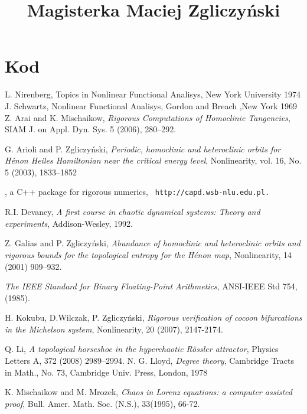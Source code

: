 \documentclass[10pt,a4paper]{article}
\begin{document}
\title{Magisterka Maciej Zgliczyński}










\section{Kod}


\begin{thebibliography}{GSS}

 L. Nirenberg, Topics in Nonlinear Functional Analisys, New York University  1974
 J. Schwartz, Nonlinear Functional Analisys, Gordon and Breach ,New York 1969 
 Z. Arai and K. Mischaikow, \emph{Rigorous Computations of Homoclinic Tangencies}, SIAM J. on Appl. Dyn. Sys. 5 (2006), 280--292.


 G. Arioli and P. Zgliczy\'nski, \emph{Periodic, homoclinic and heteroclinic orbits
for H\'{e}non Heiles Hamiltonian near the critical energy level},
Nonlinearity, vol. 16, No. 5 (2003), 1833--1852

, a C++ package for rigorous numerics, {\tt
http://capd.wsb-nlu.edu.pl.}

 R.I. Devaney, \emph{A first course in chaotic dynamical systems: Theory and
experiments}, Addison-Wesley, 1992.

 Z. Galias and P. Zgliczy\'nski, \emph{Abundance of homoclinic and heteroclinic orbits and
rigorous bounds for the topological entropy for the H\'enon map},
Nonlinearity, 14 (2001) 909--932.

 \emph{The IEEE Standard for Binary Floating-Point
Arithmetics}, ANSI-IEEE Std 754, (1985).

 H. Kokubu, D.Wilczak,  P. Zgliczy\'nski,
 \emph{Rigorous verification of cocoon bifurcations in the Michelson
system}, Nonlinearity, 20 (2007), 2147-2174.

 Q. Li, \emph{A topological horseshoe in the hyperchaotic R\"ossler attractor},
Physics Letters A, 372 (2008) 2989--2994.
 N. G. Lloyd, \emph{Degree theory}, Cambridge
Tracts in Math., No. 73, Cambridge Univ. Press, London, 1978

 K. Mischaikow and M. Mrozek,
\emph{Chaos in Lorenz equations: a computer assisted proof},
Bull. Amer. Math. Soc. (N.S.), 33(1995), 66-72.


\end{thebibliography}
\end{document}
